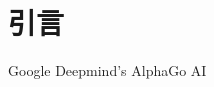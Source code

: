 
\section{引言}
Google Deepmind's AlphaGo AI\cite{DBLP:journals/nature/SilverHMGSDSAPL16}\cite{silver2017mastering}
